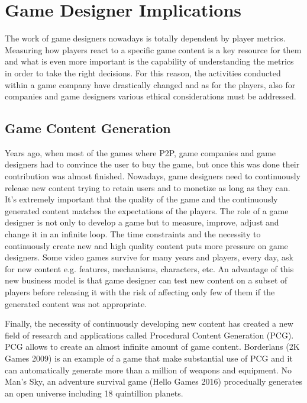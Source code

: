 \chapter{Game Designer Implications}
\label{chap:results}

 The work of game designers nowadays is totally dependent by player metrics. Measuring how players react to a specific game content is a key resource for them and what is even more important is the capability of understanding the metrics in order to take the right decisions. For this reason, the activities conducted within a game company have drastically changed and as for the players, also for companies and game designers various ethical considerations must be addressed.

\section{Game Content Generation}

Years ago, when most of the games where P2P, game companies and game designers had to convince the user to buy the game, but once this was done their contribution was almost finished. Nowadays, game designers need to continuously release new content trying to retain users and to monetize as long as they can. It's extremely important that the quality of the game and the continuously generated content matches the expectations of the players. The role of a game designer is not only to develop a game but to measure, improve, adjust and change it in an infinite loop.
The time constraints and the necessity to continuously create new and high quality content puts more pressure on game designers. Some video games survive for many years and players, every day, ask for new content e.g. features, mechanisms, characters, etc. An advantage of this new business model is that game designer can test new content on a subset of players before releasing it with the risk of affecting only few of them if the generated content was not appropriate. 

Finally, the necessity of continuously developing new content has created a new field of research and applications called  Procedural Content Generation (PCG). PCG allows to create an almost infinite amount of game content. Borderlans (2K Games 2009) is an example of a game that make substantial use of PCG and it can automatically generate more than a million of weapons and equipment. No Man's Sky, an adventure survival game (Hello Games 2016) procedually generates an open universe including 18 quintillion planets. 


